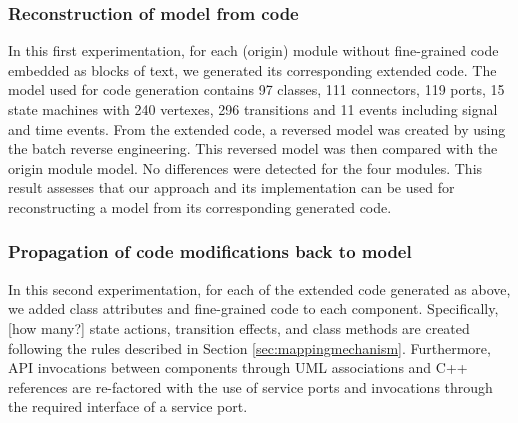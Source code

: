 \subsubsection{Reconstruction of model from code}
In this first experimentation, for each (origin) module without fine-grained code embedded as blocks of text, we generated its corresponding extended code.
The model used for code generation contains 97 classes, 111 connectors, 119 ports, 15 state machines with 240 vertexes, 296 transitions and 11 events including signal and time events.
From the extended code, a reversed model was created by using the batch reverse engineering.
This reversed model was then compared with the origin module model.
No differences were detected for the four modules.
This result assesses that our approach and its implementation can be used for reconstructing a model from its corresponding generated code.
   
\subsubsection{Propagation of code modifications back to model}
In this second experimentation, for each of the extended code generated as above, we added class attributes and fine-grained code to each component.
Specifically, [how many?] state actions, transition effects, and class methods are created following the rules described in Section \ref{sec:mappingmechanism}.
Furthermore, API invocations between components through UML associations and C++ references are re-factored with the use of service ports and invocations through the required interface of a service port.


